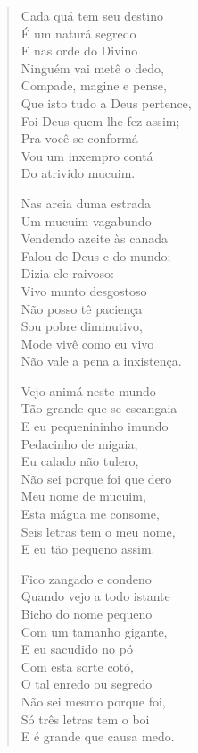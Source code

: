 \begin{verse}
Cada quá tem seu destino\\
É um naturá segredo\\
E nas orde do Divino\\
Ninguém vai metê o dedo,\\
Compade, magine e pense,\\
Que isto tudo a Deus pertence,\\
Foi Deus quem lhe fez assim;\\
Pra você se conformá\\
Vou um inxempro contá\\
Do atrivido mucuim.

Nas areia duma estrada\\
Um mucuim vagabundo\\
Vendendo azeite às canada\\
Falou de Deus e do mundo;\\
Dizia ele raivoso:\\
Vivo munto desgostoso\\
Não posso tê paciença\\
Sou pobre diminutivo,\\
Mode vivê como eu vivo\\
Não vale a pena a inxistença.

Vejo animá neste mundo\\
Tão grande que se escangaia\\
E eu pequenininho imundo\\
Pedacinho de migaia,\\
Eu calado não tulero,\\
Não sei porque foi que dero\\
Meu nome de mucuim,\\
Esta mágua me consome,\\
Seis letras tem o meu nome,\\
E eu tão pequeno assim.

Fico zangado e condeno\\
Quando vejo a todo istante\\
Bicho do nome pequeno\\
Com um tamanho gigante,\\
E eu sacudido no pó\\
Com esta sorte cotó,\\
O tal enredo ou segredo\\
Não sei mesmo porque foi,\\
Só três letras tem o boi\\
E é grande que causa medo.


\end{verse}
